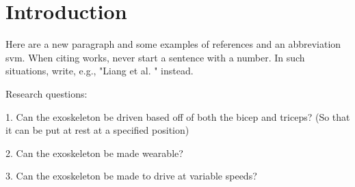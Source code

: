 \section{Introduction}
\label{section:intro}

Here are a new paragraph and some examples of references and an abbreviation \cite{IEEEtran, IEEEtranformatexample, webpage, FundConDep, exampleofjournalarticle, exampleofconferencepaper}
\ac{svm}. When citing works, never start a sentence with a number. In such situations, write, e.g., "Liang et al. \cite{exampleofconferencepaper}" instead.


Research questions:

%
%
%

1.	Can the exoskeleton be driven based off of both the bicep and triceps? (So that it can be put at rest at a specified position)

2.	Can the exoskeleton be made wearable?

3.	Can the exoskeleton be made to drive at variable speeds?

